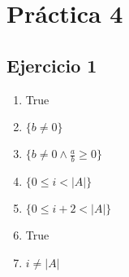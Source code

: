 
\usepackage{caratula}
\usepackage{enumerate}
\usepackage{hyperref}
\usepackage{graphicx}
\usepackage{amsfonts}
\usepackage{enumitem}

\decimalpoint
\hypersetup{colorlinks=true, linkcolor=black, urlcolor=blue}
\setlength{\parindent}{0em}
\setlength{\parskip}{0.5em}
\setcounter{tocdepth}{2} %
\setcounter{section}{3} %
\renewcommand{\thesubsubsection}{\thesubsection.\Alph{subsubsection}}
\graphicspath{ {images/} }





\maketitle
\newpage

\tableofcontents
\newpage


\section{Práctica 4}

\subsection{Ejercicio 1}
\begin{enumerate}
    \item True
    \item $ \{ b \neq 0 \} $
    \item $ \{ b \neq 0  \wedge \frac{a}{b} \geq 0 \} $
    \item $ \{ 0 \leq i < |A| \} $
    \item $ \{ 0 \leq i + 2 < |A| \} $
    \item True
    \item $ i \neq |A| $
\end{enumerate}


